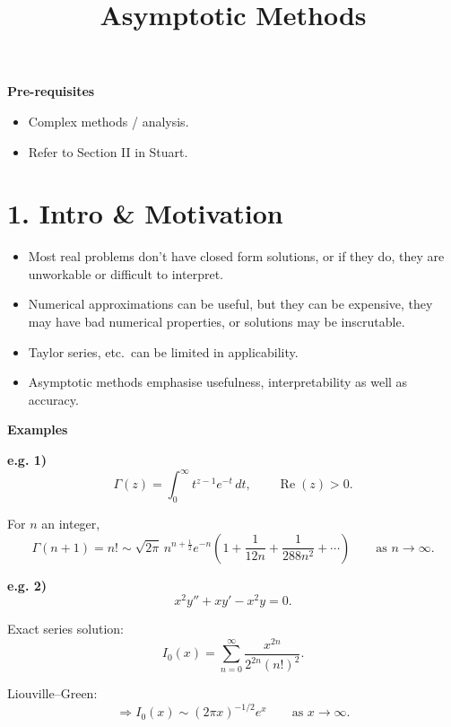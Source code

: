 \documentclass[11pt,a4paper]{article}
\title{Asymptotic Methods}
\begin{document}
\maketitle
\thispagestyle{empty}

\noindent\textbf{Pre-requisites}
\begin{itemize}
    \item Complex methods / analysis.
    \item Refer to Section II in Stuart.
\end{itemize}

\section*{1. Intro \& Motivation}

\begin{itemize}
    \item Most real problems don't have closed form solutions, or if they do, they are unworkable or difficult to interpret.

    \item Numerical approximations can be useful, but they can be expensive, they may have bad numerical properties, or solutions may be inscrutable.

    \item Taylor series, etc.\ can be limited in applicability.

    \item Asymptotic methods emphasise usefulness, interpretability as well as accuracy.
\end{itemize}

\noindent\textbf{Examples}

\medskip

\noindent\textbf{e.g. 1)}
\[
\Gamma(z)=\int_0^\infty t^{z-1}e^{-t}\,dt,
\qquad \operatorname{Re}(z)>0.
\]

For $n$ an integer,
\[
\Gamma(n+1)=n!
\sim \sqrt{2\pi}\,n^{n+\frac12}e^{-n}
\left(
1+\frac{1}{12n}+\frac{1}{288n^2}+\cdots
\right)
\qquad \text{as }n\to\infty.
\]

\medskip

\noindent\textbf{e.g. 2)}
\[
x^2y''+xy'-x^2y=0.
\]

Exact series solution:
\[
I_0(x)=\sum_{n=0}^{\infty}
\frac{x^{2n}}{2^{2n}(n!)^2}.
\]

Liouville--Green:
\[
\Longrightarrow
I_0(x)\sim(2\pi x)^{-1/2}e^x
\qquad \text{as }x\to\infty.
\]

\medskip
\end{document}
